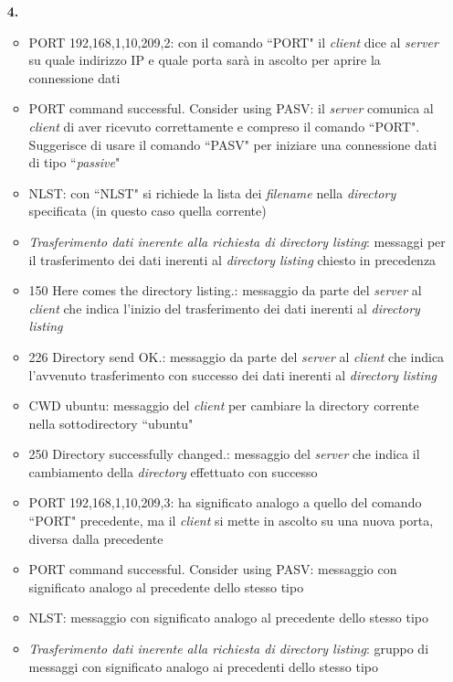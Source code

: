 \documentclass[a4paper, 12pt]{report}
\begin{document}
\begin{enumerate}
\begin{tabularx}{\linewidth}{>{\hsize=0.5\hsize}X|X|>{\hsize=0.35\hsize}X|>{\hsize=0.275\hsize}X|>{\hsize=0.275\hsize}X}
        \end{tabularx}
    \item [\textbf{4.}]
        \begin{itemize}
            \item PORT 192,168,1,10,209,2: con il comando ``PORT" il \textit{client} dice al \textit{server} su quale indirizzo IP e quale porta sarà in ascolto per aprire la
            connessione dati
            \item PORT command successful. Consider using PASV: il \textit{server} comunica al \textit{client} di aver ricevuto correttamente e compreso il comando ``PORT".
	        Suggerisce di usare il comando ``PASV" per iniziare una connessione dati di tipo ``\textit{passive}"
            \item NLST: con ``NLST" si richiede la lista dei \textit{filename} nella \textit{directory} specificata (in questo caso quella corrente)
            \item \textit{Trasferimento dati inerente alla richiesta di directory listing}: messaggi per il trasferimento dei dati inerenti al \textit{directory listing}
            chiesto in precedenza
	        \item 150 Here comes the directory listing.: messaggio da parte del \textit{server} al \textit{client} che indica l'inizio del trasferimento dei dati inerenti al \textit{directory listing}
	        \item 226 Directory send OK.: messaggio da parte del \textit{server} al \textit{client} che indica l'avvenuto trasferimento con successo dei dati inerenti al \textit{directory listing}    
            \item CWD ubuntu: messaggio del \textit{client} per cambiare la directory corrente nella sottodirectory ``ubuntu"
            \item 250 Directory successfully changed.: messaggio del \textit{server} che indica il cambiamento della \textit{directory} effettuato con successo
            \item PORT 192,168,1,10,209,3: ha significato analogo a quello del comando ``PORT" precedente, ma il \textit{client} si mette in ascolto su una nuova porta, diversa
            dalla precedente
            \item PORT command successful. Consider using PASV: messaggio con significato analogo al precedente dello stesso tipo
            \item NLST: messaggio con significato analogo al precedente dello stesso tipo
            \item \textit{Trasferimento dati inerente alla richiesta di directory listing}: gruppo di messaggi con significato analogo ai precedenti dello stesso tipo

\end{itemize}
\end{enumerate}
\end{document}
